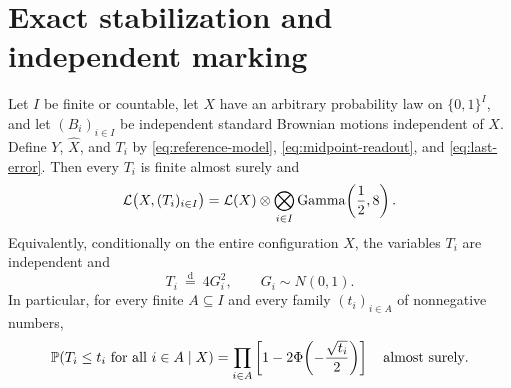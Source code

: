 \section{Exact stabilization and independent marking}

\begin{theorem}\label{thm:main}
Let $I$ be finite or countable, let $X$ have an arbitrary probability law on
$\{0,1\}^I$, and let $(B_i)_{i\in I}$ be independent standard Brownian
motions independent of $X$.  Define $Y$, $\widehat X$, and $T_i$ by
\eqref{eq:reference-model}, \eqref{eq:midpoint-readout}, and
\eqref{eq:last-error}.  Then every $T_i$ is finite almost surely and
\begin{equation}\label{eq:main-product-law}
  \Law\bigl(X,(T_i)_{i\in I}\bigr)
  =\Law(X)\otimes
  \bigotimes_{i\in I}\GammaLaw\!\left(\frac12,8\right).
\end{equation}
Equivalently, conditionally on the entire configuration $X$, the variables
$T_i$ are independent and
\begin{equation}\label{eq:Ti-law}
  T_i\ \stackrel{\mathrm d}{=}\ 4G_i^2,
  \qquad G_i\sim N(0,1).
\end{equation}
In particular, for every finite $A\subseteq I$ and every family
$(t_i)_{i\in A}$ of nonnegative numbers,
\begin{equation}\label{eq:joint-cdf}
  \P\!\left(T_i\le t_i\ \text{for all }i\in A\mid X\right)
  =\prod_{i\in A}
  \left[1-2\Phi\!\left(-\frac{\sqrt{t_i}}2\right)\right]
  \quad\text{almost surely}.
\end{equation}
\end{theorem}

